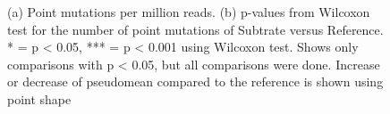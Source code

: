 

\begin{figure}[h!]
    \centering
    \caption{(a) Point mutations per million reads. (b) p-values from Wilcoxon test for the number of point mutations of Subtrate versus Reference. * = p < 0.05, *** = p < 0.001 using Wilcoxon test. Shows only comparisons with p < 0.05, but all comparisons were done. Increase or decrease of pseudomean compared to the reference is shown using point shape}
    \label{both_hits_substrate}
\end{figure}


